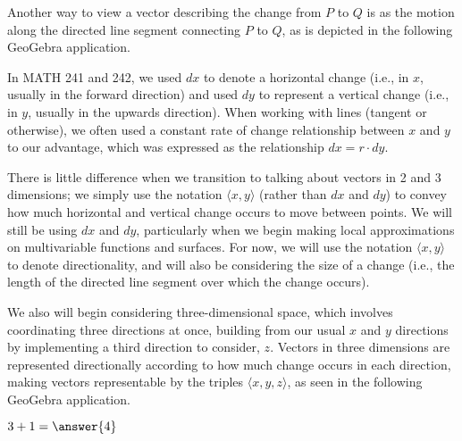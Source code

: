 \documentclass{ximera}
\begin{document}
\begin{center}
\end{center}

Another way to view a vector describing the change from $P$ to $Q$ is as the motion along the directed line segment connecting $P$ to $Q$, as is depicted in the following GeoGebra application.

\begin{center}
\end{center}

In MATH 241 and 242, we used $dx$ to denote a horizontal change (i.e., in $x$, usually in the forward direction) and used $dy$ to represent a vertical change (i.e., in $y$, usually in the upwards direction). When working with lines (tangent or otherwise), we often used a constant rate of change relationship between $x$ and $y$ to our advantage, which was expressed as the relationship $dx=r\cdot dy$.

There is little difference when we transition to talking about vectors in 2 and 3 dimensions; we simply use the notation $\langle x,y\rangle$ (rather than $dx$ and $dy$) to convey how much horizontal and vertical change occurs to move between points. We will still be using $dx$ and $dy$, particularly when we begin making local approximations on multivariable functions and surfaces. For now, we will use the notation $\langle x,y\rangle$ to denote directionality, and will also be considering the size of a change (i.e., the length of the directed line segment over which the change occurs).

We also will begin considering three-dimensional space, which involves coordinating three directions at once, building from our usual $x$ and $y$ directions by implementing a third direction to consider, $z$. Vectors in three dimensions are represented directionally according to how much change occurs in each direction, making vectors representable by the triples $\langle x,y,z\rangle$, as seen in the following GeoGebra application.

\begin{center}
\end{center}

\begin{exercise}
    $3+1=\answer{4}$
\end{exercise}

\begin{multipleChoice}
\end{multipleChoice}
\end{document}
